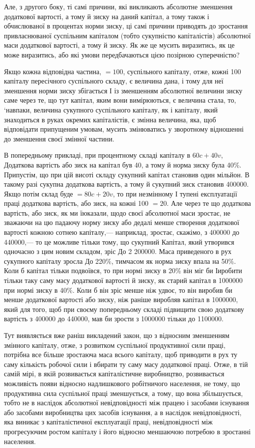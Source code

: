 \documentclass[12pt, a4paper, final]{memoir}
\begin{document}
Але, з другого боку, ті самі причини, які викликають абсолютне зменшення додаткової вартості, а тому й зиску на даний капітал, а тому також і обчислюваної в процентах норми зиску, ці самі причини приводять до зростання привласнюваної суспільним капіталом (тобто сукупністю капіталістів) абсолютної маси додаткової вартості, а тому й зиску. Як же це мусить виразитись, як це може виразитись, або які умови передбачаються цією позірною суперечністю?

Якщо кожна відповідна частина, $=100$, суспільного капіталу, отже, кожні 100 капіталу пересічного суспільного складу, є величина дана, і тому для неї зменшення норми зиску збігається І із зменшенням абсолютної величини зиску саме через те, що тут капітал, яким вони вимірюються, є величина стала, то, ‘навпаки, величина сукупного суспільного капіталу, як і капіталу, який знаходиться в руках окремих капіталістів, є змінна величина, яка, щоб відповідати припущеним умовам, мусить змінюватись у зворотному відношенні до зменшення своєї змінної частини.

В попередньому прикладі, при процентному складі капіталу в $60c + 40v$, Додаткова вартість або зиск на капітал був 40, а тому й норма зиску була 40\%. Припустім, що при цій висоті складу сукупний капітал становив один мільйон. В такому разі сукупна додаткова вартість, а тому й сукупний зиск становив 400000. Якщо потім склад буде $=80c + 20v$, то при незмінному І тупені експлуатації праці додаткова вартість, або зиск, на кожні 100 $=20$. Але через те що додаткова вартість, або зиск, як ми їюказали, щодо своєї абсолютної маси зростає, не зважаючи на цю падаючу норму зиску або дедалі менше створення додаткової вартості кожною сотнею капіталу,— наприклад, зростає, скажімо, з 400000 до 440000,— то це можливе тільки тому, що сукупний Капітал, який утворився одночасно з цим новим складом, зріс До 2 200000. Маса приведеного в рух сукупного капіталу зросла До 220\%, тимчасом як норма зиску впала на 50\%. Коли б капітал тільки подвоївся, то при нормі зиску в 20\% він міг би Іиробити тільки таку саму масу додаткової вартості й зиску, як старий капітал в 1000000 при нормі зиску в 40\%. Коли б він зріс менше ніж удвоє, то він виробив би менше додаткової вартості або зиску, ніж раніше виробляв капітал в 1000000, який для того, щоб при своєму попередньому складі підвищити свою додаткову вартість з 400000 до 440000, мав би зрости з 1000000 тільки до 1100000.

Тут виявляється вже раніш викладений закон, що з відносним зменшенням змінного капіталу, отже, з розвитком суспільної продуктивної сили праці, потрібна все більше зростаюча маса всього капіталу, щоб приводити в рух ту саму кількість робочої сили і вбирати ту саму масу додаткової праці. Отже, в тій самій мірі, в якій розвивається капіталістичне виробництво, розвивається можливість появи відносно надлишкового робітничого населення, не тому, що продуктивна сила суспільної праці зменшується, а тому, що вона збільшується, тобто не в наслідок абсолютної невідповідності між працею і засобами існування або засобами виробництва цих засобів існування, а в наслідок невідповідності, яка виникає з капіталістичної експлуатації праці, невідповідності між прогресуючим ростом капіталу і його відносно меншаючою потребою в зростанні населення.
\end{document}
